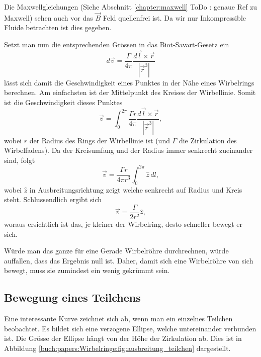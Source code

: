Die Maxwellgleichungen (Siehe Abschnitt \ref{chapter:maxwell} ToDo : genaue Ref zu Maxwell) sehen auch vor das \(\vec{B}\) Feld quellenfrei ist. 
Da wir nur Inkompressible Fluide betrachten ist dies gegeben.

Setzt man nun die entsprechenden Grössen in das Biot-Savart-Gesetz ein 
\[
d \vec{v}
=
\frac{\Gamma}{4\pi}\frac{d \vec{l} \times \vec{r}}{\left\lvert \vec{r}^{3}\right\rvert }
\]
lässt sich damit die Geschwindigkeit eines Punktes in der Nähe eines Wirbelrings berechnen. 
Am einfachsten ist der Mittelpunkt des Kreises der Wirbellinie. 
Somit ist die Geschwindigkeit dieses Punktes
\[
\vec{v}
=
\int_{0}^{2\pi} \frac{\Gamma r}{4\pi}\frac{d \vec{l} \times \vec{r}}{\left\lvert \vec{r}^{3}\right\rvert },
\]
wobei \(r\) der Radius des Rings der Wirbellinie ist (und \(\Gamma\) die Zirkulation des Wirbelfadens). 
Da der Kreisumfang und der Radius immer senkrecht zueinander sind, folgt 
\[
\vec{v}
=
\frac{\Gamma r}{4\pi r^{3}} \int_{0}^{2\pi} \hat{z}\, dl,
\]
wobei \(\hat{z}\) in Ausbreitungsrichtung zeigt welche senkrecht auf Radius und Kreis steht. 
Schlussendlich ergibt sich
\[
\vec{v}
=
\frac{\Gamma }{2 r^2}\hat{z},
\]
woraus ersichtlich ist das, je kleiner der Wirbelring, desto schneller bewegt er sich.

Würde man das ganze für eine Gerade Wirbelröhre durchrechnen, würde auffallen, dass das Ergebnis null ist. 
Daher, damit sich eine Wirbelröhre von sich bewegt, muss sie zumindest ein wenig gekrümmt sein.

\subsection{Bewegung eines Teilchens}



Eine interessante Kurve zeichnet sich ab, wenn man ein einzelnes Teilchen beobachtet. 
Es bildet sich eine verzogene Ellipse, welche untereinander verbunden ist. 
Die Grösse der Ellipse hängt von der Höhe der Zirkulation ab. 
Dies ist in Abbildung \ref{buch:papers:Wirbelringe:fig:ausbreitung_teilchen} dargestellt.
